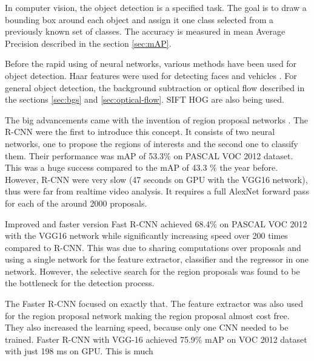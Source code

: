 \documentclass[a4paper,12pt,titlepage, twoside]{article}
\numberwithin{figure}{section}
\begin{document}
In computer vision, the object detection is a specified task. The goal is to draw a bounding box around each object and assign it one class selected from a previously known set of classes. The accuracy is measured in mean Average Precision described in the section \ref{sec:mAP}. 

Before the rapid using of neural networks, various methods have been used for object detection. Haar features were used for detecting faces \cite{haar, lienhart2002extended, viola2004robust} and vehicles \cite{sun2002real}. For general object detection, the background subtraction \cite{piccardi2004background, horprasert1999statistical} or optical flow \cite{naoya1990optical, quenot1992orthogonal} described in the sections \ref{sec:bgs} and \ref{sec:optical-flow}. SIFT \cite{lowe2004distinctive} HOG \cite{girshick2014rich, wang2009hog, zhu2006fast, felzenszwalb2010object, dalal2005histograms} are also being used.

The big advancements came with the invention of region proposal networks \cite{girshick2016region}. The R-CNN \cite{DBLP:journals/corr/GirshickDDM13} were the first to introduce this concept. It consists of two neural networks, one to propose the regions of interests and the second one to classify them. Their performance was mAP of 53.3\% on PASCAL VOC 2012 dataset. This was a huge success compared to the mAP of 43.3 \%\cite{carreira2012cpmc} the year before. However, R-CNN were very slow (47 seconds on GPU with the VGG16 \cite{simonyan2014very} network), thus were far from realtime video analysis. It requires a full AlexNet forward pass for each of the around 2000 proposals.

Improved and faster version Fast R-CNN \cite{girshick2015fast} achieved 68.4\% on PASCAL VOC 2012 with the VGG16 network while significantly increasing speed over 200 times compared to R-CNN. This was due to sharing computations over proposals and using a single network for the feature extractor, classifier and the regressor in one network. However, the selective search for the region proposals was found to be the bottleneck for the detection process.

The Faster R-CNN focused on exactly that. The feature extractor was also used for the region proposal network making the region proposal almost cost free. They also increased the learning speed, because only one CNN needed to be trained. Faster R-CNN with VGG-16 achieved 75.9\% mAP on VOC 2012 dataset with just 198 ms on GPU. This is much 
\end{document}
